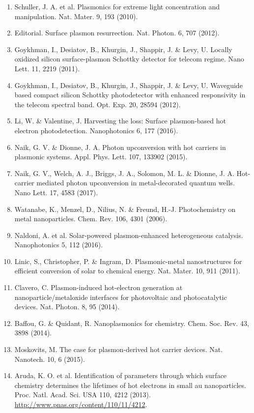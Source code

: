 \documentclass[10pt]{article}
\begin{document}
\begin{enumerate}
  \item Schuller, J. A. et al. Plasmonics for extreme light concentration and manipulation. Nat. Mater. 9, 193 (2010).
  \item Editorial. Surface plasmon resurrection. Nat. Photon. 6, 707 (2012).
  \item Goykhman, I., Desiatov, B., Khurgin, J., Shappir, J. \& Levy, U. Locally oxidized silicon surface-plasmon Schottky detector for telecom regime. Nano Lett. 11, 2219 (2011).
  \item Goykhman, I., Desiatov, B., Khurgin, J., Shappir, J. \& Levy, U. Waveguide based compact silicon Schottky photodetector with enhanced responsivity in the telecom spectral band. Opt. Exp. 20, 28594 (2012).
  \item Li, W. \& Valentine, J. Harvesting the loss: Surface plasmon-based hot electron photodetection. Nanophotonics 6, 177 (2016).
  \item Naik, G. V. \& Dionne, J. A. Photon upconversion with hot carriers in plasmonic systems. Appl. Phys. Lett. 107, 133902 (2015).
  \item Naik, G. V., Welch, A. J., Briggs, J. A., Solomon, M. L. \& Dionne, J. A. Hot-carrier mediated photon upconversion in metal-decorated quantum wells. Nano Lett. 17, 4583 (2017).
  \item Watanabe, K., Menzel, D., Nilius, N. \& Freund, H.-J. Photochemistry on metal nanoparticles. Chem. Rev. 106, 4301 (2006).
  \item Naldoni, A. et al. Solar-powered plasmon-enhanced heterogeneous catalysis. Nanophotonics 5, 112 (2016).
  \item Linic, S., Christopher, P. \& Ingram, D. Plasmonic-metal nanostructures for efficient conversion of solar to chemical energy. Nat. Mater. 10, 911 (2011).
  \item Clavero, C. Plasmon-induced hot-electron generation at nanoparticle/metaloxide interfaces for photovoltaic and photocatalytic devices. Nat. Photon. 8, 95 (2014).
  \item Baffou, G. \& Quidant, R. Nanoplasmonics for chemistry. Chem. Soc. Rev. 43, 3898 (2014).
  \item Moskovits, M. The case for plasmon-derived hot carrier devices. Nat. Nanotech. 10, 6 (2015).
  \item Aruda, K. O. et al. Identification of parameters through which surface chemistry determines the lifetimes of hot electrons in small au nanoparticles. Proc. Natl. Acad. Sci. USA 110, 4212 (2013). \href{http://www.pnas.org/content/110/11/4212}{http://www.pnas.org/content/110/11/4212}.

\end{enumerate}
\end{document}
